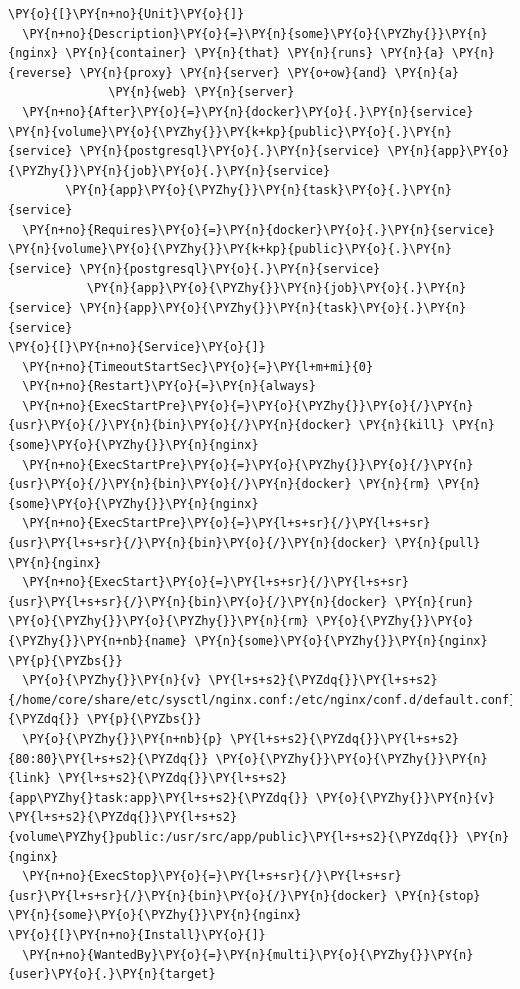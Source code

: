 \begin{codelisting}
\label{code:nginx.service}
\begin{Verbatim}[fontsize=\relsize{-2.5},fontseries=b,commandchars=\\\{\}]
\PY{o}{[}\PY{n+no}{Unit}\PY{o}{]} 
  \PY{n+no}{Description}\PY{o}{=}\PY{n}{some}\PY{o}{\PYZhy{}}\PY{n}{nginx} \PY{n}{container} \PY{n}{that} \PY{n}{runs} \PY{n}{a} \PY{n}{reverse} \PY{n}{proxy} \PY{n}{server} \PY{o+ow}{and} \PY{n}{a} 
              \PY{n}{web} \PY{n}{server}
  \PY{n+no}{After}\PY{o}{=}\PY{n}{docker}\PY{o}{.}\PY{n}{service} \PY{n}{volume}\PY{o}{\PYZhy{}}\PY{k+kp}{public}\PY{o}{.}\PY{n}{service} \PY{n}{postgresql}\PY{o}{.}\PY{n}{service} \PY{n}{app}\PY{o}{\PYZhy{}}\PY{n}{job}\PY{o}{.}\PY{n}{service} 
        \PY{n}{app}\PY{o}{\PYZhy{}}\PY{n}{task}\PY{o}{.}\PY{n}{service}
  \PY{n+no}{Requires}\PY{o}{=}\PY{n}{docker}\PY{o}{.}\PY{n}{service} \PY{n}{volume}\PY{o}{\PYZhy{}}\PY{k+kp}{public}\PY{o}{.}\PY{n}{service} \PY{n}{postgresql}\PY{o}{.}\PY{n}{service} 
           \PY{n}{app}\PY{o}{\PYZhy{}}\PY{n}{job}\PY{o}{.}\PY{n}{service} \PY{n}{app}\PY{o}{\PYZhy{}}\PY{n}{task}\PY{o}{.}\PY{n}{service}
\PY{o}{[}\PY{n+no}{Service}\PY{o}{]} 
  \PY{n+no}{TimeoutStartSec}\PY{o}{=}\PY{l+m+mi}{0}
  \PY{n+no}{Restart}\PY{o}{=}\PY{n}{always} 
  \PY{n+no}{ExecStartPre}\PY{o}{=}\PY{o}{\PYZhy{}}\PY{o}{/}\PY{n}{usr}\PY{o}{/}\PY{n}{bin}\PY{o}{/}\PY{n}{docker} \PY{n}{kill} \PY{n}{some}\PY{o}{\PYZhy{}}\PY{n}{nginx} 
  \PY{n+no}{ExecStartPre}\PY{o}{=}\PY{o}{\PYZhy{}}\PY{o}{/}\PY{n}{usr}\PY{o}{/}\PY{n}{bin}\PY{o}{/}\PY{n}{docker} \PY{n}{rm} \PY{n}{some}\PY{o}{\PYZhy{}}\PY{n}{nginx}
  \PY{n+no}{ExecStartPre}\PY{o}{=}\PY{l+s+sr}{/}\PY{l+s+sr}{usr}\PY{l+s+sr}{/}\PY{n}{bin}\PY{o}{/}\PY{n}{docker} \PY{n}{pull} \PY{n}{nginx} 
  \PY{n+no}{ExecStart}\PY{o}{=}\PY{l+s+sr}{/}\PY{l+s+sr}{usr}\PY{l+s+sr}{/}\PY{n}{bin}\PY{o}{/}\PY{n}{docker} \PY{n}{run} \PY{o}{\PYZhy{}}\PY{o}{\PYZhy{}}\PY{n}{rm} \PY{o}{\PYZhy{}}\PY{o}{\PYZhy{}}\PY{n+nb}{name} \PY{n}{some}\PY{o}{\PYZhy{}}\PY{n}{nginx} \PY{p}{\PYZbs{}}
  \PY{o}{\PYZhy{}}\PY{n}{v} \PY{l+s+s2}{\PYZdq{}}\PY{l+s+s2}{/home/core/share/etc/sysctl/nginx.conf:/etc/nginx/conf.d/default.conf}\PY{l+s+s2}{\PYZdq{}} \PY{p}{\PYZbs{}}
  \PY{o}{\PYZhy{}}\PY{n+nb}{p} \PY{l+s+s2}{\PYZdq{}}\PY{l+s+s2}{80:80}\PY{l+s+s2}{\PYZdq{}} \PY{o}{\PYZhy{}}\PY{o}{\PYZhy{}}\PY{n}{link} \PY{l+s+s2}{\PYZdq{}}\PY{l+s+s2}{app\PYZhy{}task:app}\PY{l+s+s2}{\PYZdq{}} \PY{o}{\PYZhy{}}\PY{n}{v} \PY{l+s+s2}{\PYZdq{}}\PY{l+s+s2}{volume\PYZhy{}public:/usr/src/app/public}\PY{l+s+s2}{\PYZdq{}} \PY{n}{nginx} 
  \PY{n+no}{ExecStop}\PY{o}{=}\PY{l+s+sr}{/}\PY{l+s+sr}{usr}\PY{l+s+sr}{/}\PY{n}{bin}\PY{o}{/}\PY{n}{docker} \PY{n}{stop} \PY{n}{some}\PY{o}{\PYZhy{}}\PY{n}{nginx}
\PY{o}{[}\PY{n+no}{Install}\PY{o}{]} 
  \PY{n+no}{WantedBy}\PY{o}{=}\PY{n}{multi}\PY{o}{\PYZhy{}}\PY{n}{user}\PY{o}{.}\PY{n}{target}
\end{Verbatim}
\end{codelisting}

